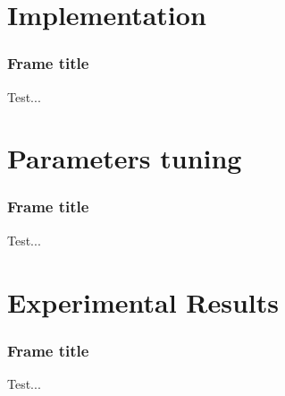 \documentclass{beamer}
\begin{document}

\section{Implementation}


\begin{frame}
\frametitle{Frame title}

Test...

\end{frame}




\section{Parameters tuning}


\begin{frame}
\frametitle{Frame title}

Test...

\end{frame}




\section{Experimental Results}


\begin{frame}
\frametitle{Frame title}

Test...

\end{frame}
\end{document}
